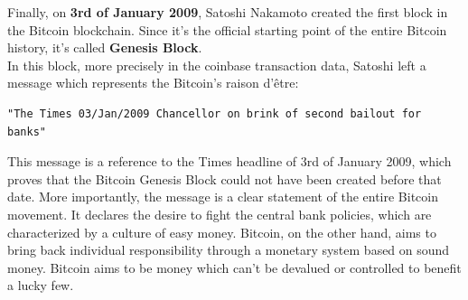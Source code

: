 Finally, on \textbf{3rd of January 2009}, Satoshi Nakamoto created the first block in the Bitcoin blockchain. Since it's the official starting point of the entire Bitcoin history, it's called \textbf{Genesis Block}.\\
In this block, more precisely in the coinbase transaction data, Satoshi left a message which represents the Bitcoin's raison d'\^etre:
\begin{verbatim}
"The Times 03/Jan/2009 Chancellor on brink of second bailout for banks"
\end{verbatim}
This message is a reference to the Times headline of 3rd of January 2009, which proves that the Bitcoin Genesis Block could not have been created before that date. More importantly, the message is a clear statement of the entire Bitcoin movement. It declares the desire to fight the central bank policies, which are characterized by a culture of easy money. Bitcoin, on the other hand, aims to bring back individual responsibility through a monetary system based on sound money. Bitcoin aims to be money which can't be devalued or controlled to benefit a lucky few. 
